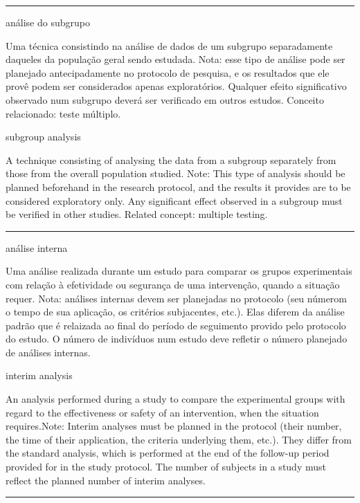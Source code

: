\documentclass[
]{book}
\begin{document}
\begin{center}\rule{0.5\linewidth}{0.5pt}\end{center}

análise do subgrupo

Uma técnica consistindo na análise de dados de um subgrupo separadamente daqueles da população geral sendo estudada. Nota: esse tipo de análise pode ser planejado antecipadamente no protocolo de pesquisa, e os resultados que ele provê podem ser considerados apenas exploratórios. Qualquer efeito significativo observado num subgrupo deverá ser verificado em outros estudos. Conceito relacionado: teste múltiplo.

subgroup analysis

A technique consisting of analysing the data from a subgroup separately from those from the overall population studied. Note: This type of analysis should be planned beforehand in the research protocol, and the results it provides are to be considered exploratory only. Any significant effect observed in a subgroup must be verified in other studies. Related concept: multiple testing.

\begin{center}\rule{0.5\linewidth}{0.5pt}\end{center}

análise interna

Uma análise realizada durante um estudo para comparar os grupos experimentais com relação à efetividade ou segurança de uma intervenção, quando a situação requer. Nota: análises internas devem ser planejadas no protocolo (seu númerom o tempo de sua aplicação, os critérios subjacentes, etc.). Elas diferem da análise padrão que é relaizada ao final do período de seguimento provido pelo protocolo do estudo. O número de indivíduos num estudo deve refletir o número planejado de análises internas.

interim analysis

An analysis performed during a study to compare the experimental groups with regard to the effectiveness or safety of an intervention, when the situation requires.Note: Interim analyses must be planned in the protocol (their number, the time of their application, the criteria underlying them, etc.). They differ from the standard analysis, which is performed at the end of the follow-up period provided for in the study protocol. The number of subjects in a study must reflect the planned number of interim analyses.

\begin{center}\rule{0.5\linewidth}{0.5pt}\end{center}
\end{document}

